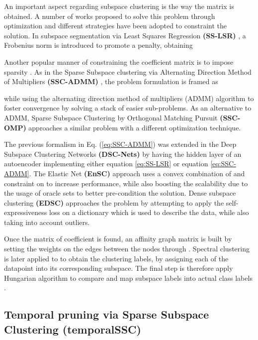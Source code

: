\documentclass[10pt,a4paper,conference]{IEEEtran}
\begin{document}
An important aspect regarding subspace clustering is the way the matrix  is obtained. A number of works proposed to solve this problem through optimization \cite{lu2012robust,elhamifar2013sparse,ji2014efficient,you2016scalable,you2016oracle,ji2017deep} and different strategies have been adopted to constraint the solution.
In subspace segmentation via Least Squares Regression \textbf{(SS-LSR)} \cite{lu2012robust}, a Frobenius norm is introduced to promote a  penalty, obtaining


Another popular manner of constraining the coefficient matrix  is to impose sparsity \cite{elhamifar2013sparse,you2016oracle,ji2017deep}.
As in the Sparse Subspace clustering via Alternating Direction Method of Multipliers \textbf{(SSC-ADMM)} \cite{elhamifar2013sparse}, the problem formulation is framed as

while using the alternating direction method of multipliers (ADMM) algorithm to foster convergence by solving a stack of easier sub-problems. 
As an alternative to ADMM, Sparse Subspace Clustering by Orthogonal Matching Pursuit \textbf{{(SSC-OMP)}} \cite{you2016scalable} approaches a similar problem with a different optimization technique. 

The previous formalism in Eq. (\ref{eq:SSC-ADMM}) was extended in the Deep Subspace Clustering Networks \textbf{(DSC-Nets)} \cite{ji2017deep} by having the hidden layer of an autoencoder implementing either equation \eqref{eq:SS-LSR} or equation \eqref{eq:SSC-ADMM}.
The Elastic Net \textbf{(EnSC)} \cite{you2016oracle} approach uses a convex combination of  and  constraint on  to increase performance, while also boosting the scalability due to the usage of oracle sets to better pre-condition the solution.
Dense subspace clustering \textbf{(EDSC)} \cite{ji2014efficient} approaches the problem by attempting to apply the self-expressiveness loss on a dictionary which is used to describe the data, while also taking into account outliers. 

Once the matrix of coefficient  is found, an affinity graph matrix  is built by setting the weights on the edges between the nodes through .
Spectral clustering is later applied to  to obtain the clustering labels, by assigning each of the  datapoint  into its corresponding subspace.
The final step is therefore apply Hungarian algorithm to compare and map subspace labels into actual class labels \cite{vidal2011subspace}.

\subsection{Temporal pruning via Sparse Subspace Clustering (temporalSSC)}\label{sec:timeSSC}
\end{document}
